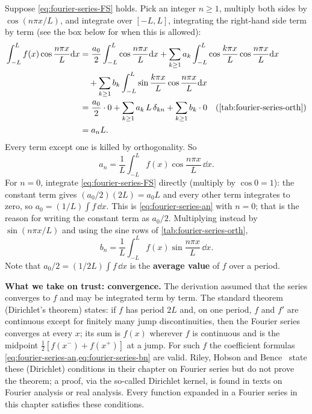 Suppose \cref{eq:fourier-series-FS} holds. Pick an integer $n\ge1$, multiply both sides by $\cos(n\pi x/L)$, and integrate over $[-L,L]$, integrating the right-hand side term by term (see the box below for when this is allowed):
\begin{align}
\int_{-L}^{L}f(x)\cos\frac{n\pi x}{L}\dd x
&=\frac{a_0}{2}\int_{-L}^{L}\cos\frac{n\pi x}{L}\dd x
+\sum_{k\ge1}a_k\int_{-L}^{L}\cos\frac{k\pi x}{L}\cos\frac{n\pi x}{L}\dd x\nonumber\\
&\quad+\sum_{k\ge1}b_k\int_{-L}^{L}\sin\frac{k\pi x}{L}\cos\frac{n\pi x}{L}\dd x\\
&=\frac{a_0}{2}\cdot0+\sum_{k\ge1}a_k\,L\,\delta_{kn}+\sum_{k\ge1}b_k\cdot 0\quad\text{(\cref{tab:fourier-series-orth})}\\
&=a_n L .
\end{align}
Every term except one is killed by orthogonality. So
\begin{equation}
a_n=\frac1L\int_{-L}^{L}f(x)\cos\frac{n\pi x}{L}\,\dd x .
\label{eq:fourier-series-an}
\end{equation}
For $n=0$, integrate \cref{eq:fourier-series-FS} directly (multiply by $\cos 0=1$): the constant term gives $(a_0/2)(2L)=a_0L$ and every other term integrates to zero, so $a_0=(1/L)\int f\,\dd x$. This is \cref{eq:fourier-series-an} with $n=0$; that is the reason for writing the constant term as $a_0/2$. Multiplying instead by $\sin(n\pi x/L)$ and using the sine rows of \cref{tab:fourier-series-orth},
\begin{equation}
b_n=\frac1L\int_{-L}^{L}f(x)\sin\frac{n\pi x}{L}\,\dd x .
\label{eq:fourier-series-bn}
\end{equation}
Note that $a_0/2=(1/2L)\int f\,\dd x$ is the \textbf{average value} of $f$ over a period.

\begin{beyond}
\textbf{What we take on trust: convergence.} The derivation assumed that the series converges to $f$ and may be integrated term by term. The standard theorem (Dirichlet's theorem) states: if $f$ has period $2L$ and, on one period, $f$ and $f'$ are continuous except for finitely many jump discontinuities, then the Fourier series converges at every $x$; its sum is $f(x)$ wherever $f$ is continuous and is the midpoint $\tfrac12[f(x^-)+f(x^+)]$ at a jump. For such $f$ the coefficient formulas \cref{eq:fourier-series-an,eq:fourier-series-bn} are valid. Riley, Hobson and Bence~\cite{rhb} state these (Dirichlet) conditions in their chapter on Fourier series but do not prove the theorem; a proof, via the so-called Dirichlet kernel, is found in texts on Fourier analysis or real analysis. Every function expanded in a Fourier series in this chapter satisfies these conditions.
\end{beyond}


